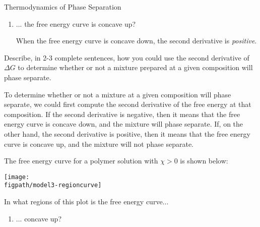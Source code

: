 \begin{activity}{Thermodynamics of Phase Separation}
\begin{ctqs}
\begin{enumerate}
\begin{solution}[1in]{}
					\end{solution}
					
				\item ... the free energy curve is concave up?
					
					\begin{solution}[1in]{}
					
						When the free energy curve is concave down, the second derivative is \emph{positive}.
						
					\end{solution}
					
			\end{enumerate}
		
		\question Describe, in 2-3 complete sentences, how you could use the second derivative of $\Delta G$ to determine whether or not a mixture prepared at a given composition will phase separate.
					
					\begin{solution}[3in]{}
					
						To determine whether or not a mixture at a given composition will phase separate, we could first compute the second derivative of the free energy at that composition.  If the second derivative is negative, then it means that the free energy curve is concave down, and the mixture will phase separate.  If, on the other hand, the second derivative is positive, then it means that the free energy curve is concave up, and the mixture will not phase separate.
					
					\end{solution}
					
\end{ctqs}

\clearpage
\begin{model}
\label{\labelbase:mdl:phaseboundaries}

The free energy curve for a polymer solution with $\chi > 0$ is shown below:

\centerline{\texttt{[image: \\figpath/model3-regioncurve]}}

\end{model}

\begin{ctqs}

		\question \label{ctq:regionconcavity} In what regions of this plot is the free energy curve...
			\begin{enumerate}
				\item ... concave up?
					

\end{enumerate}
\end{ctqs}
\end{activity}
